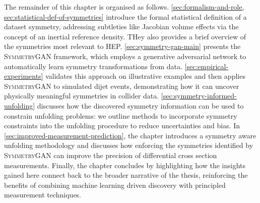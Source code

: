     The remainder of this chapter is organised as follows.
    \cref{sec:formalism-and-role, sec:statistical-def-of-symmetries} introduce the formal statistical definition of a dataset symmetry, addressing subtleties like Jacobian volume effects via the concept of an inertial reference density.
    THey also provides a brief overview of the symmetries most relevant to HEP.
    \cref{sec:symmetry-gan-main} presents the \textsc{SymmetryGAN} framework, which employs a generative adversarial network to automatically learn symmetry transformations from data.
    \cref{sec:empirical-experiments} validates this approach on illustrative examples and then applies \textsc{SymmetryGAN} to simulated dijet events, demonstrating how it can uncover physically meaningful symmetries in collider data.
    \cref{sec:symmetry-informed-unfolding} discusses how the discovered symmetry information can be used to constrain unfolding problems: we outline methods to incorporate symmetry constraints into the unfolding procedure to reduce uncertainties and bias.
    In \cref{sec:improved-measurement-prediction}, the chapter introduces a symmetry aware unfolding methodology and discusses how enforcing the symmetries identified by \textsc{SymmetryGAN} can improve the precision of differential cross section measurements.
    Finally, the chapter concludes by highlighting how the insights gained here connect back to the broader narrative of the thesis, reinforcing the benefits of combining machine learning driven discovery with principled measurement techniques.
